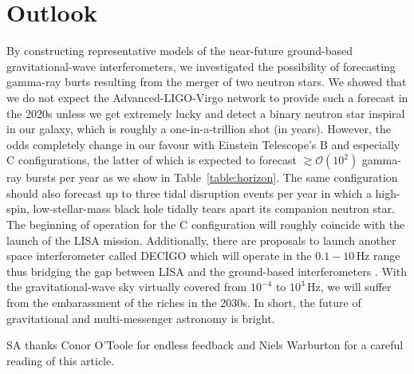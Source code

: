 \documentclass[prd,amsmath,amssymb,aps,floats,amsfonts,notitlepage,superscriptaddress,eqsecnum,nofootinbib,10pt]{revtex4-1}
\newcommand{\ord}{\mathcal{O}}
\begin{document}
\section{Outlook}
By constructing representative models of the near-future ground-based gravitational-wave interferometers, we investigated the possibility of
forecasting gamma-ray burts resulting from the merger of two neutron stars.
We showed that we do not expect the Advanced-LIGO-Virgo network to provide such a forecast in the 2020s unless we get extremely lucky
and detect a binary neutron star inspiral in our galaxy, which is roughly a one-in-a-trillion shot (in years). %
However, the odds completely change in our favour with Einstein Telescope's B and especially C configurations, 
the latter of which is expected to forecast $\gtrsim \ord(10^2)$ gamma-ray bursts per year as we show in Table~\ref{table:horizon}. 
The same configuration should also forecast up to three tidal disruption events per year in which a high-spin, low-stellar-mass
black hole tidally tears apart its companion neutron star.
The beginning of operation for the C configuration will roughly coincide with the launch of the LISA mission.
Additionally, there are proposals to launch another space interferometer called DECIGO which will operate
in the $0.1 - 10\,$Hz range thus bridging the gap between LISA and the ground-based interferometers \cite{Sato:2009zzb, Kawamura:2006zz}.
With the gravitational-wave sky virtually covered from $10^{-4}$ to $10^3\,$Hz, we will suffer from the 
embarassment of the riches in the 2030s. In short, the future of gravitational and multi-messenger astronomy is bright.

\acknowledgements 
SA thanks Conor O'Toole for endless feedback and Niels Warburton for a careful reading of this article. 
 
 

%


 
 
 
 
 
 
 
\end{document}
